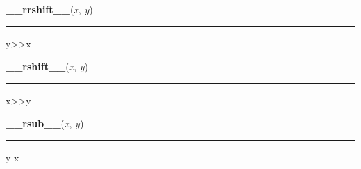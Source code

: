     \begin{boxedminipage}{\textwidth}

    \raggedright \textbf{\_\_rrshift\_\_}(\textit{x}, \textit{y})

    \vspace{-1.5ex}

    \rule{\textwidth}{0.5\fboxrule}

y{\textgreater}{\textgreater}x
    \vspace{1ex}

    \end{boxedminipage}

    \label{numpy:ndarray:__rshift__}

    \vspace{0.5ex}

    \begin{boxedminipage}{\textwidth}

    \raggedright \textbf{\_\_rshift\_\_}(\textit{x}, \textit{y})

    \vspace{-1.5ex}

    \rule{\textwidth}{0.5\fboxrule}

x{\textgreater}{\textgreater}y
    \vspace{1ex}

    \end{boxedminipage}

    \label{numpy:ndarray:__rsub__}

    \vspace{0.5ex}

    \begin{boxedminipage}{\textwidth}

    \raggedright \textbf{\_\_rsub\_\_}(\textit{x}, \textit{y})

    \vspace{-1.5ex}

    \rule{\textwidth}{0.5\fboxrule}

y-x
    \vspace{1ex}

    \end{boxedminipage}

    \label{numpy:ndarray:__rtruediv__}

    \vspace{0.5ex}

